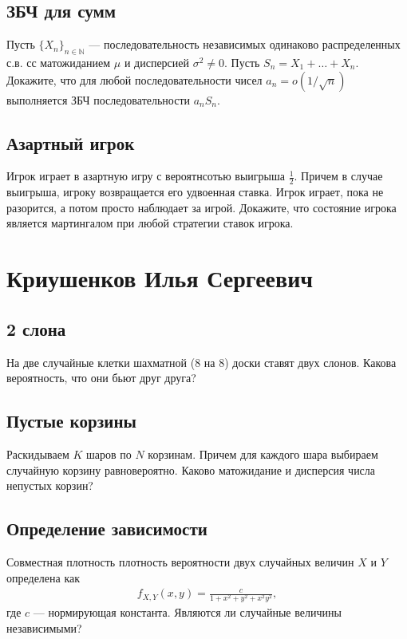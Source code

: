 \documentclass[12pt]{article}
\newcommand\N{\mathbb{N}}
\begin{document}
\subsection{ЗБЧ для сумм}
Пусть $\{X_n\}_{n \in \N}$ --- последовательность независимых одинаково распределенных с.в. сс матожиданием $\mu$ и дисперсией $\sigma^2 \ne 0$. Пусть $S_n = X_1 + \dots + X_n$. Докажите, что для любой последовательности чисел $a_n = o(1/\sqrt{n})$ выполняется ЗБЧ последовательности $a_n S_n$.



\subsection{Азартный игрок}

Игрок играет в азартную игру с вероятнсотью выигрыша $\frac{1}{2}$. Причем в случае выигрыша, игроку возвращается его удвоенная ставка. Игрок играет, пока не разорится, а потом просто наблюдает за игрой. Докажите, что состояние игрока является мартингалом при любой стратегии ставок игрока.



\newpage
\section{Криушенков Илья Сергеевич}

\subsection{2 слона}

На две случайные клетки шахматной (8 на 8) доски ставят двух слонов. Какова вероятность, что они бьют друг друга?



\subsection{Пустые корзины}

Раскидываем $K$ шаров по $N$ корзинам. Причем для каждого шара выбираем случайную корзину равновероятно. Каково матожидание и дисперсия числа непустых корзин?



\subsection{Определение зависимости}

Совместная плотность плотность вероятности двух случайных величин $X$ и $Y$ определена как
\begin{align*}
    f_{X, Y}(x, y) = \frac{c}{1 + x^2 + y^2 + x^2y^2},
\end{align*}
где $c$ --- нормирующая константа. Являются ли случайные величины независимыми?
\end{document}
